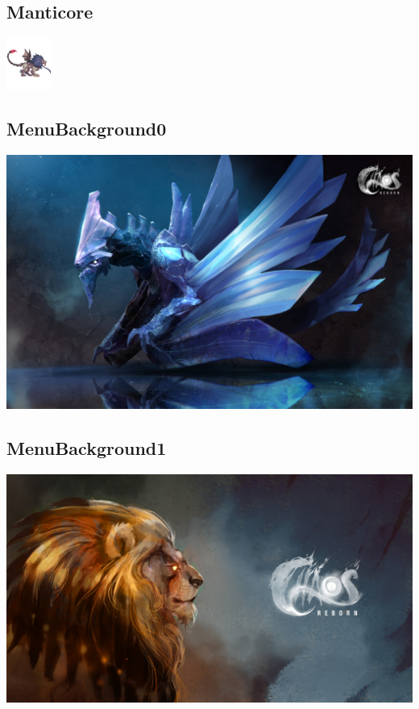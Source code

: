 \documentclass[a4paper,12pt]{scrartcl}
\begin{document}
	\subsection{Manticore}
	\begin{center}\includegraphics{Prog2_EA_V2/Art/Manticore.png}\end{center}
	\subsection{MenuBackground0}
	\begin{center}\includegraphics{Prog2_EA_V2/Art/MenuBackground0.png}\end{center}
	\subsection{MenuBackground1}
	\begin{center}\includegraphics{Prog2_EA_V2/Art/MenuBackground1.png}\end{center}
\end{document}

